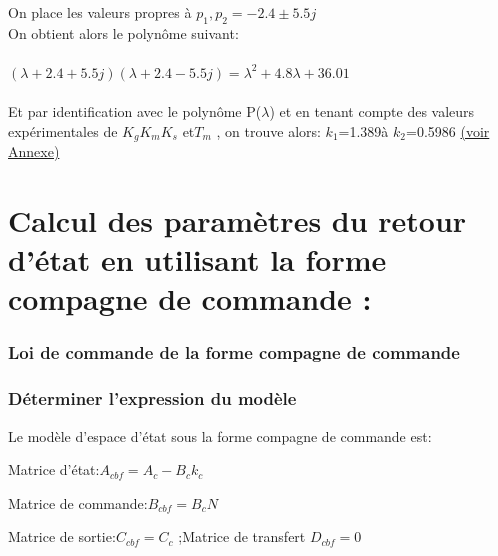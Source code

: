 \documentclass[12pt, a4paper, openany]{report}
\begin{document}
On place les valeurs propres à $p_{1},p_{2}=-2.4\pm5.5j$\\

On obtient alors le polynôme suivant: \\\\
$(\lambda+2.4+5.5j)(\lambda+2.4-5.5j)={\lambda}^2+4.8\lambda+36.01$\\\\

Et par identification avec le polynôme P($\lambda$) et en tenant compte des valeurs expérimentales de $K_{g} K_{m} K_{s}$ et$T_{m}$ , on trouve alors:  $k_1$=1.389à \quad $k_2$=0.5986 \hyperref[section1.1]{(voir Annexe)}\label{annexe1}\\



\section{Calcul des paramètres du retour d'état en utilisant la forme compagne de commande :}

\subsubsection{Loi de commande de la forme compagne de commande }

\subsubsection{Déterminer l'expression du modèle}
Le modèle d'espace d'état sous la forme compagne de commande est:\\
\begin{itemize}
Matrice d'état:$A_{cbf}=A_c-B_ck_c$\\
\end{itemize}
\begin{itemize}
Matrice de commande:$B_{cbf}=B_cN$\\
\end{itemize}
\begin{itemize}
Matrice de sortie:$C_{cbf}=C_c$ ;\quad Matrice de transfert $D_{cbf}=0$\\
\end{itemize}
\end{document}
